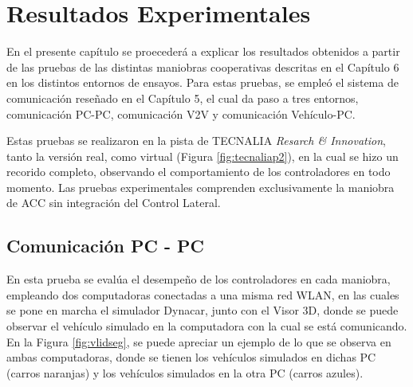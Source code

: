 \chapter{Resultados Experimentales}
\thispagestyle{empty}

En el presente capítulo se proecederá a explicar los resultados obtenidos a partir de las pruebas de las distintas maniobras cooperativas descritas en el Capítulo 6 en los distintos entornos de ensayos. Para estas pruebas, se empleó el sistema de comunicación reseñado en el Capítulo 5, el cual da paso a tres entornos, comunicación PC-PC, comunicación V2V y comunicación Vehículo-PC.\\

\par Estas pruebas se realizaron en la pista de TECNALIA \textit{Resarch \& Innovation}, tanto la versión real, como virtual (Figura \ref{fig:tecnaliap2}), en la cual se hizo un recorido completo, observando el comportamiento de los controladores en todo momento. Las pruebas experimentales comprenden exclusivamente la maniobra de ACC sin integración del Control Lateral.   

\section{Comunicación PC - PC}
En esta prueba se evalúa el desempeño de los controladores en cada maniobra, empleando dos computadoras conectadas a una misma red WLAN, en las cuales se pone en marcha el simulador Dynacar, junto con el Visor 3D, donde se puede observar el vehículo simulado en la computadora con la cual se está comunicando. En la Figura \ref{fig:vlidseg}, se puede apreciar un ejemplo de lo que se observa en ambas computadoras, donde se tienen los vehículos simulados en dichas PC (carros naranjas) y los vehículos simulados en la otra PC (carros azules).\\   

